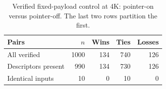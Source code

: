 \begin{table}[H]
\centering
\footnotesize
\setlength{\tabcolsep}{4pt}
\caption{Verified fixed-payload control at 4K: pointer-on versus pointer-off. The last two rows partition the first.}
\label{tab:sub-control}
\begin{tabular}{lrrrr}
\toprule
Pairs & $n$ & Wins & Ties & Losses \\
\midrule
All verified & 1000 & 134 & 740 & 126 \\
Descriptors present & 990 & 134 & 730 & 126 \\
Identical inputs & 10 & 0 & 10 & 0 \\
\bottomrule
\end{tabular}
\end{table}
